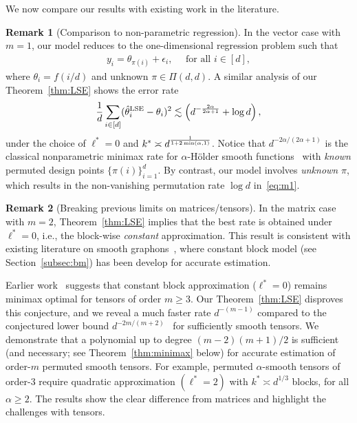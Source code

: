 \documentclass[11pt]{article}
\theoremstyle{definition}
\newtheorem{rmk}{Remark}
\begin{document}
We now compare our results with existing work in the literature.
\begin{rmk}[Comparison to non-parametric regression]
In the vector case with $m = 1$,  our model reduces to the one-dimensional regression problem such that
\begin{align}
    y_i  = \theta_{\pi(i)}+\epsilon_i,  \quad\text{ for all } i\in [d],
\end{align}
where $\theta_i=f(i/d)$ and unknown $\pi \in \Pi(d,d)$.
A similar analysis of our Theorem~\ref{thm:LSE} shows the error rate
\begin{align}\label{eq:m1}
    \frac{1}{d}\sum_{i\in[d]}(\hat\theta_i^{\text{LSE}}-\theta_i)^2 \lesssim \left(d^{-{2\alpha\over 2\alpha+1}}+\log d\right),
\end{align}
under the choice of $\ell^* = 0$ and $k^* \asymp d^{1\over 1+2\min(\alpha,1)}$.
Notice that  $d^{-2\alpha/(2\alpha+1)}$ is the  classical nonparametric minimax rate for $\alpha$-Hölder smooth functions~\citep{tsybakov2009introduction} with \emph{known} permuted design points $\{\pi(i)\}_{i=1}^d$. By contrast, our model involves \emph{unknown} $\pi$, which results in the non-vanishing permutation rate $\log d$ in~\eqref{eq:m1}.
\end{rmk}

\begin{rmk}[Breaking previous limits on matrices/tensors]
In the matrix case with $m=2$, Theorem~\ref{thm:LSE} implies that the best rate is obtained under $\ell^*=0$, i.e., the block-wise \emph{constant} approximation. This result is consistent with existing literature on smooth graphons~\citep{bickel2009nonparametric,gao2015rate,klopp2017oracle}, where constant block model (see Section~\ref{subsec:bm}) has been develop for accurate estimation.

Earlier work~\citep{balasubramanian2021nonparametric} suggests that constant block approximation ($\ell^*=0$) remains minimax optimal for tensors of order $m\geq 3$. Our Theorem~\ref{thm:LSE} disproves this conjecture, and we reveal a much faster rate $d^{-(m-1)}$ compared to the conjectured lower bound $d^{-2m/( m+2)}$~\citep{balasubramanian2021nonparametric} for sufficiently smooth tensors. We demonstrate that a polynomial up to degree $(m-2)(m+1)/2$ is sufficient (and necessary; see Theorem~\ref{thm:minimax} below) for accurate estimation of order-$m$ permuted smooth tensors. 
For example, permuted $\alpha$-smooth tensors of order-3 require quadratic approximation $(\ell^*=2)$ with $k^*\asymp d^{1/3}$ blocks, for all $\alpha\geq 2$. The results show the clear difference from matrices and highlight the challenges with tensors.
\end{rmk}
\end{document}
